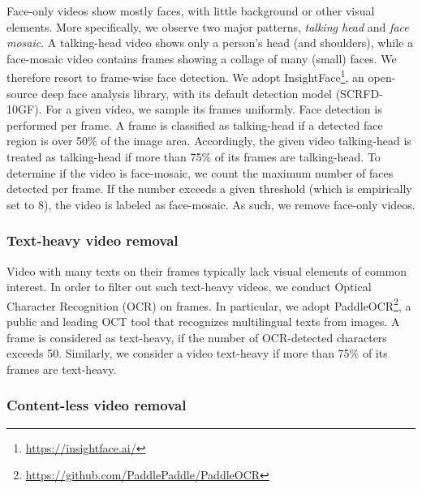 Face-only videos show mostly faces, with little background or other visual elements. More specifically, we observe two major patterns, \ie \emph{talking head} and \emph{face mosaic}. A talking-head video shows only a person's head (and shoulders), while a face-mosaic video contains frames showing a collage of many (small) faces. We therefore resort to frame-wise face detection. We adopt InsightFace\footnote{\url{https://insightface.ai/}}, an open-source deep face analysis library, with its default detection model (SCRFD-10GF). For a given video, we sample its frames uniformly. Face detection is performed per frame. A frame is classified as talking-head if a detected face region is over 50\% of the image area. Accordingly, the given video talking-head is treated as talking-head if more than 75\% of its frames are talking-head. To determine if the video is face-mosaic, we count the maximum number of faces detected per frame. If the number exceeds a given threshold (which is empirically set to 8), the video is labeled as face-mosaic. As such, we remove face-only videos.


















\subsubsection{Text-heavy video removal}

Video with many texts on their frames typically lack visual elements of common interest. In order to filter out such text-heavy videos, we conduct Optical Character Recognition (OCR) on frames. In particular, we adopt PaddleOCR\footnote{\url{https://github.com/PaddlePaddle/PaddleOCR}}, a public and leading OCT tool that recognizes multilingual texts from images. A frame is considered as text-heavy, if the number of OCR-detected characters exceeds 50. Similarly, we consider a video text-heavy if more than 75\% of its frames are text-heavy.



\subsubsection{Content-less video removal}

